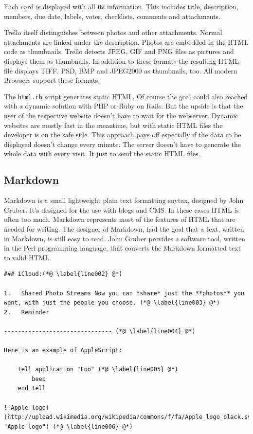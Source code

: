 Each card is displayed with all its information. This includes title, description, members, due date, labels, votes, checklists, comments and attachments.

Trello itself distinguishes between photos and other attachments. Normal attachments are linked under the description. Photos are embedded in the HTML code as thumbnails. Trello detects JPEG, GIF and PNG files as pictures and displays them as thumbnails. In addition to these formats the resulting HTML file displays TIFF, PSD, BMP and JPEG2000 as thumbnails, too. All modern Browsers support these formats.

The \texttt{html.rb} script generates static HTML. Of course the goal could also reached with a dynamic solution with PHP or Ruby on Rails. But the upside is that the user of the respective website doesn't have to wait for the webserver. Dynamic websites are mostly fast in the meantime, but with static HTML files the developer is on the safe side. This approach pays off especially if the data to be displayed doesn't change every minute. The server doesn't have to generate the whole data with every visit. It just to send the static HTML files.

\subsection{Markdown}
Markdown is a small lightweight plain text formatting snytax, designed by John Gruber. It's designed for the use with blogs and CMS. In these cases HTML is often too much. Markdown represents most of the features of HTML that are needed for writing. The designer of Markdown, had the goal that a text, written in Markdown, is still easy to read. John Gruber provides a software tool, written in the Perl programming language, that converts the Markdown formatted text to valid HTML. \cite{markdown}

\begin{lstlisting}[aboveskip=1\baselineskip, style=bash, caption=Example for a text written in Markdown., label=listing006]
### iCloud:(*@ \label{line002} @*)

1.   Shared Photo Streams Now you can *share* just the **photos** you want, with just the people you choose. (*@ \label{line003} @*)
2.   Reminder

------------------------------- (*@ \label{line004} @*)

Here is an example of AppleScript:

    tell application "Foo" (*@ \label{line005} @*)
        beep
    end tell

![Apple logo](http://upload.wikimedia.org/wikipedia/commons/f/fa/Apple_logo_black.svg "Apple logo") (*@ \label{line006} @*)
\end{lstlisting}


